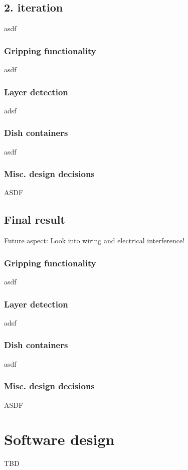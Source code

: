 \documentclass{sigchi}
\begin{document}
	\subsection{2. iteration}
		asdf
			\subsubsection{Gripping functionality}
			asdf
			
			\subsubsection{Layer detection}
			adsf
					
			\subsubsection{Dish containers}	
			asdf
			
			\subsubsection{Misc. design decisions}
			ASDF
			
	\subsection{Final result}
			Future aspect: Look into wiring and electrical interference!
			\subsubsection{Gripping functionality}
			asdf
			
			\subsubsection{Layer detection}
			adsf
					
			\subsubsection{Dish containers}	
			asdf
			
			\subsubsection{Misc. design decisions}
			ASDF
			
			
	\section{Software design}
	TBD
	
\end{document}
